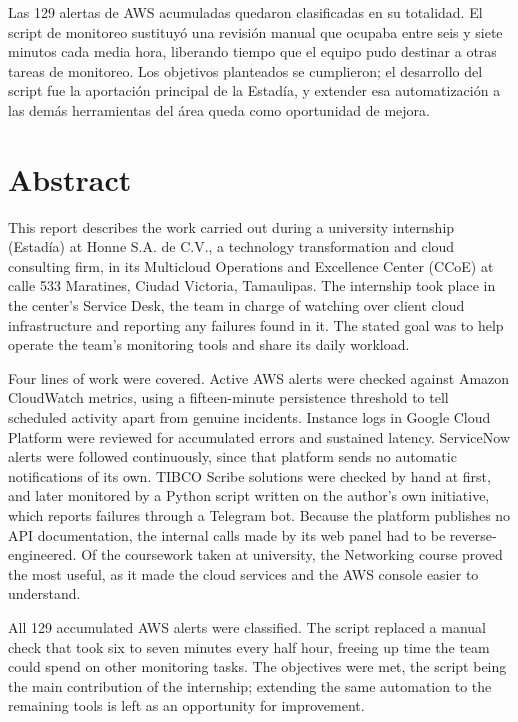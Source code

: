 \documentclass[12pt]{article}
\newcommand{\UnidadEconomica}{Honne S.A. de C.V.}
\begin{document}
Las 129 alertas de AWS acumuladas quedaron clasificadas en su totalidad. El script de monitoreo sustituyó una revisión manual que ocupaba entre seis y siete minutos cada media hora, liberando tiempo que el equipo pudo destinar a otras tareas de monitoreo. Los objetivos planteados se cumplieron; el desarrollo del script fue la aportación principal de la Estadía, y extender esa automatización a las demás herramientas del área queda como oportunidad de mejora.

\clearpage
\thispagestyle{fancy}
\section*{Abstract}

This report describes the work carried out during a university internship (Estadía) at \UnidadEconomica, a technology transformation and cloud consulting firm, in its Multicloud Operations and Excellence Center (CCoE) at calle 533 Maratines, Ciudad Victoria, Tamaulipas. The internship took place in the center's Service Desk, the team in charge of watching over client cloud infrastructure and reporting any failures found in it. The stated goal was to help operate the team's monitoring tools and share its daily workload.

Four lines of work were covered. Active AWS alerts were checked against Amazon CloudWatch metrics, using a fifteen-minute persistence threshold to tell scheduled activity apart from genuine incidents. Instance logs in Google Cloud Platform were reviewed for accumulated errors and sustained latency. ServiceNow alerts were followed continuously, since that platform sends no automatic notifications of its own. TIBCO Scribe solutions were checked by hand at first, and later monitored by a Python script written on the author's own initiative, which reports failures through a Telegram bot. Because the platform publishes no API documentation, the internal calls made by its web panel had to be reverse-engineered. Of the coursework taken at university, the Networking course proved the most useful, as it made the cloud services and the AWS console easier to understand.

All 129 accumulated AWS alerts were classified. The script replaced a manual check that took six to seven minutes every half hour, freeing up time the team could spend on other monitoring tasks. The objectives were met, the script being the main contribution of the internship; extending the same automation to the remaining tools is left as an opportunity for improvement.
\end{document}
